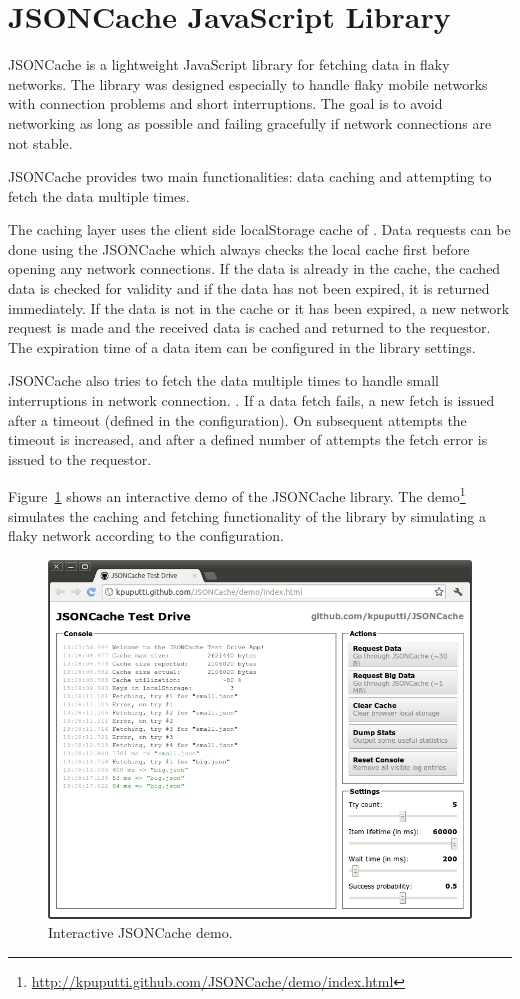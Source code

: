 \section{JSONCache JavaScript Library}
\label{section:jsoncache}

JSONCache is a lightweight JavaScript library for fetching 
data in flaky networks. The library was designed especially to handle
flaky mobile networks with connection problems and short
interruptions. The goal is to avoid networking as long as possible and
failing gracefully if network connections are not stable.

JSONCache provides two main functionalities: data caching and
attempting to fetch the data multiple times.

The caching layer uses the client side localStorage \citationneeded
cache of . Data requests can be done using the JSONCache
 which always checks the local cache first before opening
any network connections. If the data is already in the cache, the
cached data is checked for validity and if the data has not been
expired, it is returned immediately. If the data is not in the cache
or it has been expired, a new network request is made and the received
data is cached and returned to the requestor. The expiration time of a
data item can be configured in the library settings.

JSONCache also tries to fetch the data multiple times to handle small
interruptions in network connection. . If a data fetch fails, a new fetch is
issued after a timeout (defined in the configuration). On subsequent
attempts the timeout is increased, and after a defined number of
attempts the fetch error is issued to the requestor.

Figure~\ref{figure:jsoncache-demo.png} shows an interactive demo of
the JSONCache library. The
demo\footnote{\url{http://kpuputti.github.com/JSONCache/demo/index.html}}
simulates the caching and fetching functionality of the library by
simulating a flaky network according to the configuration.

\begin{figure}[ht]
  \begin{center}
    \includegraphics[width=\textwidth]{images/jsoncache-demo.png}
    \caption{Interactive JSONCache demo.}
    \label{figure:jsoncache-demo.png}
  \end{center}
\end{figure}
